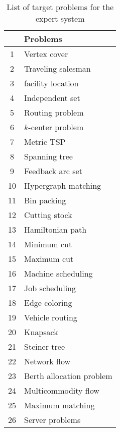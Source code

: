 \documentclass[a4paper,10pt]{article}
\begin{document}
\begin{table}[!htb]
  \begin{center}
  \begin{tabular}{c|l}
  & \textbf{Problems}\\
  \hline
1 & Vertex cover \\
2 & Traveling salesman \\
3 & facility location \\
4 & Independent set \\
5 & Routing problem \\
6 & \(k\)-center problem \\
7 & Metric TSP \\
8 & Spanning tree \\
9 & Feedback arc set \\
10 & Hypergraph matching \\
11 & Bin packing \\
12 & Cutting stock \\
13 & Hamiltonian path \\
14 & Minimum cut \\
15 & Maximum cut \\
16 & Machine scheduling \\
17 & Job scheduling \\
18 & Edge coloring \\
19 & Vehicle routing \\
20 & Knapsack \\
21 & Steiner tree \\
22 & Network flow  \\
23 & Berth allocation problem \\
24 & Multicommodity flow \\
25 & Maximum matching \\
26 & Server problems
\end{tabular}
\caption{List of target problems for the expert system}\label{table:prob}
\end{center}
\end{table}



\end{document}
